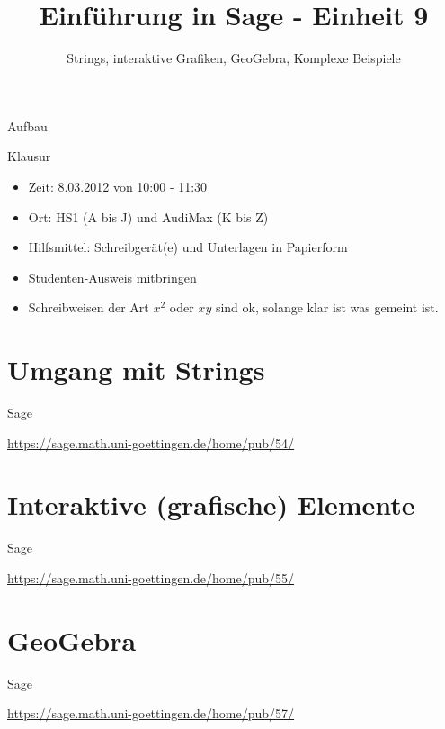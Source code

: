 \documentclass[hyperref={xetex}]{beamer}
\title{Einführung in Sage - Einheit 9}
\subtitle{Strings, interaktive Grafiken, GeoGebra, Komplexe Beispiele}
\begin{document}
\titlepage

\begin{frame}{Aufbau}
\tableofcontents
\end{frame}

\begin{frame}{Klausur}
 \begin{itemize}
\item Zeit: 8.03.2012 von 10:00 - 11:30
\item  Ort: HS1 (A bis J) und AudiMax (K bis Z)
\item  Hilfsmittel: Schreibgerät(e) und Unterlagen in Papierform
\item  Studenten-Ausweis mitbringen
\item Schreibweisen der Art $x^2$ oder $xy$ sind ok, solange klar ist was gemeint ist.
\end{itemize}

\end{frame}

\section{Umgang mit Strings}


\begin{frame}{Sage}
    \begin{center}
        \url{https://sage.math.uni-goettingen.de/home/pub/54/}
    \end{center}
\end{frame}

\section{Interaktive (grafische) Elemente}

\begin{frame}{Sage}
    \begin{center}
        \url{https://sage.math.uni-goettingen.de/home/pub/55/}
    \end{center}
\end{frame}


\section{GeoGebra}

\begin{frame}{Sage}
    \begin{center}
        \url{https://sage.math.uni-goettingen.de/home/pub/57/}
    \end{center}
\end{frame}
\end{document}
